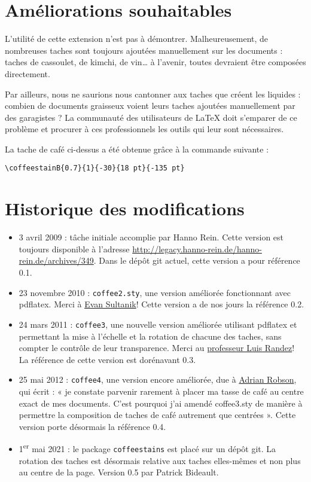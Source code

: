 \documentclass[a4paper, 11pt, BCOR = 0 pt, DIV = 13, oneside]{scrartcl}
\begin{document}
\section{Améliorations souhaitables}
L'utilité de cette extension n'est pas à démontrer. Malheureusement, de
nombreuses taches sont toujours ajoutées manuellement sur les documents : taches
de cassoulet, de kimchi, de vin\dots{} à l'avenir, toutes devraient être composées directement.

Par ailleurs, nous ne saurions nous cantonner aux taches que créent les
liquides : combien de documents graisseux voient leurs taches ajoutées
manuellement par des garagistes ? La communauté des utilisateurs de \LaTeX{}
doit s'emparer de ce problème et procurer à ces professionnels les outils qui leur
sont nécessaires.

\vfill{}

\begin{tcolorbox}
  La tache de café ci-dessus a été obtenue grâce à la commande suivante :

  \verb|\coffeestainB{0.7}{1}{-30}{18 pt}{-135 pt}|
\end{tcolorbox}
\newpage{}
\section{Historique des modifications}
\begin{itemize}
\item 3 avril 2009 : tâche initiale accomplie par Hanno Rein. Cette version est
  toujours disponible à l'adresse
  \url{http://legacy.hanno-rein.de/hanno-rein.de/archives/349}. Dans le dépôt
  git actuel, cette version a pour référence 0.1.
\item 23 novembre 2010 : \texttt{coffee2.sty}, une version améliorée fonctionnant
  avec pdflatex. Merci à \href{http://www.sultanik.com/}{Evan Sultanik}! Cette
  version a de nos jours la référence 0.2.
\item 24 mars 2011 : \texttt{coffee3}, une nouvelle version améliorée utilisant
  pdflatex et permettant la mise à l'échelle et la rotation de chacune des
  taches, sans compter le contrôle de leur transparence. Merci au \href{http://pcmap.unizar.es/~pilar/}{professeur Luis
    Randez}! La référence de cette version est dorénavant 0.3.
\item 25 mai 2012 : \texttt{coffee4}, une version encore améliorée, due à
  \href{http://nepsweb.co.uk/homeapr/}{Adrian Robson}, qui écrit : « je constate
  parvenir rarement à placer ma tasse de café au centre exact de mes documents.
  C'est pourquoi j'ai amendé coffee3.sty de manière à permettre la composition
  de taches de café autrement que centrées ». Cette
  version porte désormais la référence 0.4.
\item 1\textsuperscript{er} mai 2021 : le package \texttt{coffeestains} est
  placé sur un dépôt git. La rotation des taches est désormais relative aux
  taches elles-mêmes et non plus au centre de la page. Version 0.5 par Patrick Bideault.
\end{itemize}
\label{stainC}
\end{document}
